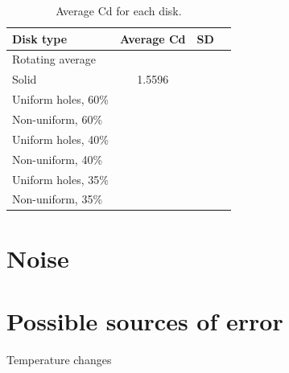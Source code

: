 
\begin{table}[H]
    \centering
    \begin{tabular}{l c c r}
         Disk type & Average Cd & SD \\
         \hline
         Rotating average &  &  \\
         Solid & 1.5596 &  \\
         Uniform holes, 60\% &  & \\
         Non-uniform, 60\% &  &  \\
         Uniform holes, 40\% &  &  \\
         Non-uniform, 40\% &  &  \\
         Uniform holes, 35\% &  & \\
         Non-uniform, 35\% &  &  \\
    \end{tabular}
    \caption{Average Cd for each disk.}
    \label{tab:AvgCD}
\end{table}


\section{Noise}











\section{Possible sources of error}
Temperature changes 

